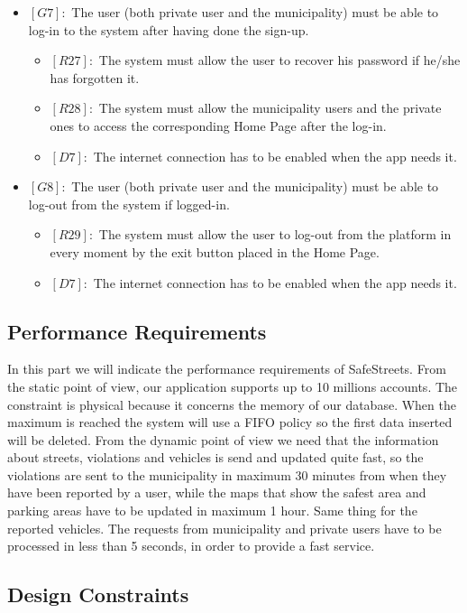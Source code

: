 \documentclass[titlepage]{article}
\begin{document}
\begin{itemize}
 
 \item $[G7]:$ The user (both private user and the municipality) must be able to log-in to the system after having done the sign-up.
 \begin{itemize}
 \item $[R27]:$ The system must allow the user to recover his password if he/she has forgotten it.
 \item $[R28]:$ The system must allow the municipality users and the private ones to access the corresponding Home Page after the log-in.
 \item $[D7]:$ The internet connection has to be enabled when the app needs it.
 \end{itemize}
 
 
 \item $[G8]:$ The user (both private user and the municipality) must be able to log-out from the system if logged-in.
 \begin{itemize}
 \item $[R29]:$ The system must allow the user to log-out from the platform in every moment by the exit button placed in the Home Page.
 \item $[D7]:$ The internet connection has to be enabled when the app needs it.
 \end{itemize}
\end{itemize}


\subsection{Performance Requirements}

In this part we will indicate the performance requirements of SafeStreets. From the static point of view, our application supports up to 10 millions accounts. The constraint is physical because it concerns the memory of our database. When the maximum is reached the system will use a FIFO policy so the first data inserted will be deleted.
From the dynamic point of view we need that the information about streets, violations and vehicles is send and updated quite fast, so the violations are sent to the municipality in maximum 30 minutes from when they have been reported by a user, while the maps that show the safest area and parking areas have to be updated in maximum 1 hour. Same thing for the reported vehicles.
The requests from municipality and private users have to be processed in less than 5 seconds, in order to provide a fast service.


\subsection{Design Constraints}
\end{document}
